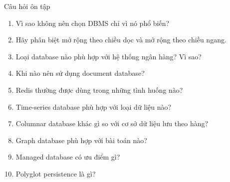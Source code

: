\documentclass[aspectratio=169,11pt]{beamer}
\newcommand{\smallitem}{\setlength{\itemsep}{2pt}\setlength{\parskip}{0pt}}
\begin{document}
\begin{frame}[allowframebreaks]{Câu hỏi ôn tập}
\small
\begin{enumerate}
  \smallitem
  \item Vì sao không nên chọn DBMS chỉ vì nó phổ biến?
  \item Hãy phân biệt mở rộng theo chiều dọc và mở rộng theo chiều ngang.
  \item Loại database nào phù hợp với hệ thống ngân hàng? Vì sao?
  \item Khi nào nên sử dụng document database?
  \item Redis thường được dùng trong những tình huống nào?
  \item Time-series database phù hợp với loại dữ liệu nào?
  \item Columnar database khác gì so với cơ sở dữ liệu lưu theo hàng?
  \item Graph database phù hợp với bài toán nào?
  \item Managed database có ưu điểm gì?
  \item Polyglot persistence là gì?
\end{enumerate}
\end{frame}
\end{document}
